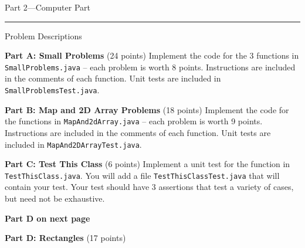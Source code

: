 \documentclass[12pt,twoside]{article}
\newcommand{\code}[1]{\texttt{#1}}
\begin{document}
\clearpage
{\Large Part 2---Computer Part}

\vspace{0.25in}
\hrule
{\large Problem Descriptions}

\textbf{Part A: Small Problems} (24 points) Implement the code for the 3 functions in \code{SmallProblems.java} -- each problem is worth 8 points. Instructions are included in the comments of each function.  Unit tests are included in \code{SmallProblemsTest.java}.

\vspace{0.15in}

\textbf{Part B: Map and 2D Array Problems} (18 points) Implement the code for the functions in \code{MapAnd2dArray.java} -- each problem is worth 9 points.  Instructions are included in the comments of each function.  Unit tests are included in \code{MapAnd2DArrayTest.java}.

\vspace{0.15in}


\textbf{Part C: Test This Class} (6 points) Implement a unit test for the function in \code{TestThisClass.java}.  You will add a file \code{TestThisClassTest.java} that will contain your test.  Your test should have 3 assertions that test a variety of cases, but need not be exhaustive.

\vspace{0.15in}

\textbf{Part D on next page}

\clearpage

\textbf{Part D: Rectangles} (17 points) 
\end{document}
